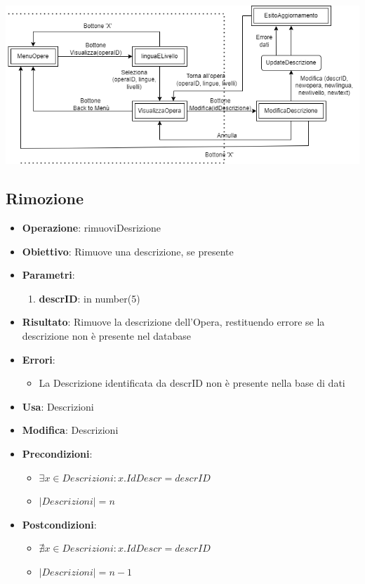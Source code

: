 \includegraphics[width=\textwidth]{img/UpdateDescr.png}\\[1cm]


\subsection{Rimozione}
\begin{itemize}
	\item \textbf{Operazione}: rimuoviDesrizione
	\item \textbf{Obiettivo}: Rimuove una descrizione, se presente
	\item \textbf{Parametri}:
	\begin{enumerate}
		\item \textbf{descrID}: in number(5)
	\end{enumerate}
	\item \textbf{Risultato}: Rimuove la descrizione dell'Opera, restituendo errore se la descrizione non è presente nel database
	\item \textbf{Errori}: 
	\begin{itemize}
		\item La Descrizione identificata da descrID non è presente nella base di dati
	\end{itemize}
	\item \textbf{Usa}: Descrizioni
	\item \textbf{Modifica}: Descrizioni
	\item \textbf{Precondizioni}:
	\begin{itemize}
		\item $\exists x \in Descrizioni : x.IdDescr = descrID$
		\item $|Descrizioni| = n$
	\end{itemize}
	\item \textbf{Postcondizioni}:
	\begin{itemize}
		\item $\nexists x \in Descrizioni : x.IdDescr = descrID$
		\item $|Descrizioni| = n - 1$
	\end{itemize}
\end{itemize}
